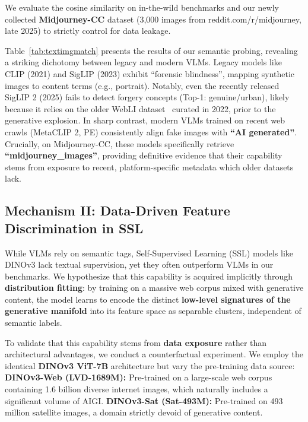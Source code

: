 \documentclass[sigconf,screen]{acmart}
\theoremstyle{plain}
\theoremstyle{definition}
\theoremstyle{remark}
\begin{document}
We evaluate the cosine similarity on in-the-wild benchmarks and our newly collected \textbf{Midjourney-CC} dataset (3,000 images from reddit.com/r/midjourney, late 2025) to strictly control for data leakage.

Table~\ref{tab:textimgmatch} presents the results of our semantic probing, revealing a striking dichotomy between legacy and modern VLMs.
Legacy models like CLIP (2021) and SigLIP (2023) exhibit ``forensic blindness'', mapping synthetic images to content terms (e.g., portrait). Notably, even the recently released SigLIP 2 (2025) fails to detect forgery concepts (Top-1: genuine/urban), likely because it relies on the older WebLI dataset~\cite{chen2022pali} curated in 2022, prior to the generative explosion. In sharp contrast, modern VLMs trained on recent web crawls (MetaCLIP 2, PE) consistently align fake images with \textbf{``AI generated''}. Crucially, on Midjourney-CC, these models specifically retrieve \textbf{``midjourney\_images''}, providing definitive evidence that their capability stems from exposure to recent, platform-specific metadata which older datasets lack.

\subsection{Mechanism II: Data-Driven Feature Discrimination in SSL}
\label{subsec:mechanism_ssl}

While VLMs rely on semantic tags, Self-Supervised Learning (SSL) models like DINOv3 lack textual supervision, yet they often outperform VLMs in our benchmarks. We hypothesize that this capability is acquired implicitly through \textbf{distribution fitting}: by training on a massive web corpus mixed with generative content, the model learns to encode the distinct \textbf{low-level signatures of the generative manifold} into its feature space as separable clusters, independent of semantic labels.

To validate that this capability stems from \textbf{data exposure} rather than architectural advantages, we conduct a counterfactual experiment. We employ the identical \textbf{DINOv3 ViT-7B} architecture but vary the pre-training data source: \textbf{DINOv3-Web (LVD-1689M):} Pre-trained on a large-scale web corpus containing 1.6 billion diverse internet images, which naturally includes a significant volume of AIGI. \textbf{DINOv3-Sat (Sat-493M):} Pre-trained on 493 million satellite images, a domain strictly devoid of generative content.
\end{document}
